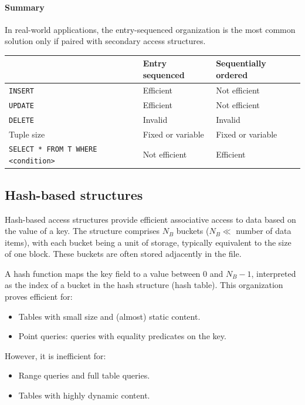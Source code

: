 \paragraph*{Summary}
In real-world applications, the entry-sequenced organization is the most common solution only if paired with secondary access structures.
\begin{table}[H]
    \centering
    \begin{tabular}{l|ll|}
    \cline{2-3}
    \textbf{}                                                         & \textbf{Entry sequenced} & \textbf{Sequentially ordered} \\ \hline
    \multicolumn{1}{|l|}{\texttt{INSERT}}                             & Efficient                & Not efficient                 \\
    \multicolumn{1}{|l|}{\texttt{UPDATE}}                             & Efficient                & Not efficient                 \\
    \multicolumn{1}{|l|}{\texttt{DELETE}}                             & Invalid                  & Invalid                       \\
    \multicolumn{1}{|l|}{Tuple size}                                  & Fixed or variable        & Fixed or variable             \\
    \multicolumn{1}{|l|}{\texttt{SELECT * FROM T WHERE <condition>}}  & Not efficient            & Efficient                     \\ \hline
    \end{tabular}
\end{table}

\subsection{Hash-based structures}
Hash-based access structures provide efficient associative access to data based on the value of a key. 
The structure comprises $N_B$ buckets ($N_B \ll$ number of data items), with each bucket being a unit of storage, typically equivalent to the size of one block. 
These buckets are often stored adjacently in the file.

A hash function maps the key field to a value between 0 and $N_B-1$, interpreted as the index of a bucket in the hash structure (hash table). 
This organization proves efficient for:
\begin{itemize}
    \item Tables with small size and (almost) static content. 
    \item Point queries: queries with equality predicates on the key.
\end{itemize}
However, it is inefficient for:
\begin{itemize}
    \item Range queries and full table queries.
    \item Tables with highly dynamic content.
\end{itemize}

